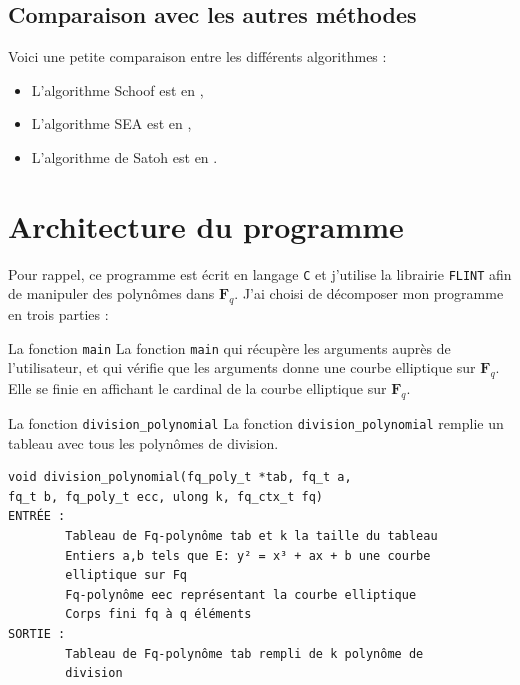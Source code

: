 \documentclass[french, lmodern]{beamer}
\newcommand\fq{\mathbf{F}_{q}}
\begin{document}
\subsection{Comparaison avec les autres méthodes}

\begin{frame}
\transwipe
Voici une petite comparaison entre les différents algorithmes :
\begin{itemize}
\item L'algorithme Schoof est en  ,
\pause
\item L'algorithme SEA est en  ,
\pause
\item L'algorithme de Satoh est en  .
\end{itemize}
\end{frame}

\section{Architecture du programme}

\begin{frame}
\transwipe
Pour rappel, ce programme est écrit en langage \texttt{C} et j'utilise la librairie \texttt{FLINT} afin de manipuler des polynômes dans $\fq$.
J'ai choisi de décomposer mon programme en trois parties :
\end{frame}

\begin{frame}{La fonction \texttt{main}}
\transwipe
La fonction \texttt{main} qui récupère les arguments auprès de l'utilisateur, et qui vérifie que les arguments donne une courbe elliptique sur $\fq$.
Elle se finie en affichant le cardinal de la courbe elliptique sur $\fq$.
\end{frame}


\begin{frame}[fragile]{La fonction \texttt{division\_polynomial}}
\transwipe
La fonction \verb|division_polynomial| remplie un tableau avec tous les polynômes de division.
\begin{verbatim}
void division_polynomial(fq_poly_t *tab, fq_t a, 
fq_t b, fq_poly_t ecc, ulong k, fq_ctx_t fq)
ENTRÉE :
    	Tableau de Fq-polynôme tab et k la taille du tableau
    	Entiers a,b tels que E: y² = x³ + ax + b une courbe 
    	elliptique sur Fq
    	Fq-polynôme eec représentant la courbe elliptique
    	Corps fini fq à q éléments
SORTIE :
    	Tableau de Fq-polynôme tab rempli de k polynôme de
    	division
\end{verbatim}
\end{frame}
	
\end{document}
